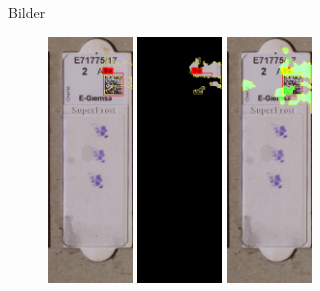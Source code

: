 \documentclass{beamer}
\begin{document}
  \begin{frame}{Bilder}
    \begin{figure}
      \includegraphics[width=0.2\textwidth]{./assets/Cell100884_1_5_top1_positiveonlywithrest.PNG}
      \hfill
      \includegraphics[width=0.2\textwidth]{./assets/Cell100884_1_5_top1_positiveonly.PNG}
      \hfill
      \includegraphics[width=0.2\textwidth]{./assets/Cell100884_1_5_top1_proscons.PNG}

\end{figure}
\end{frame}
\end{document}
